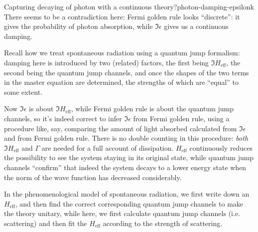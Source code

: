 \documentclass[hyperref, a4paper, 12pt]{report}
\begin{document}
\begin{theorybox}{Capturing decaying of photon with a continuous theory?}{photon-damping-epsilonk}
    There seems to be a contradiction here:
    Fermi golden rule looks ``discrete'': 
    it gives the probability of photon absorption,
    while $\Im \epsilon$ gives us a continuous damping.
    
    Recall how we treat spontaneous radiation using a quantum jump formalism:
    damping here is introduced by two (related) factors,
    the first being $\Im H_{\text{eff}}$, the second being the quantum jump channels,
    and once the shapes of the two terms in the master equation are determined,
    the strengths of which are ``equal'' to some extent.
    
    Now $\Im \epsilon$ is about $\Im H_{\text{eff}}$,
    while Fermi golden rule is about the quantum jump channels,
    so it's indeed correct to infer $\Im \epsilon$ from Fermi golden rule,
    using a procedure like, say, 
    comparing the amount of light absorbed calculated from $\Im \epsilon$ 
    and from Fermi golden rule.
    There is no double counting in this procedure:
    \emph{both} $\Im H_{\text{eff}}$ and $\Gamma$ are needed for a full account of dissipation.
    $H_{\text{eff}}$ continuously reduces the possibility 
    to see the system staying in its original state,
    while quantum jump channels ``confirm'' that 
    indeed the system decays to a lower energy state
    when the norm of the wave function has decreased considerably.
    
    In the phenomenological model of spontaneous radiation,
    we first write down an $H_{\text{eff}}$,
    and then find the correct corresponding quantum jump channels
    to make the theory unitary,
    while here, 
    we first calculate quantum jump channels (i.e. scattering)
    and then fit the $H_{\text{eff}}$ according to the strength of scattering.
\end{theorybox}
\end{document}
